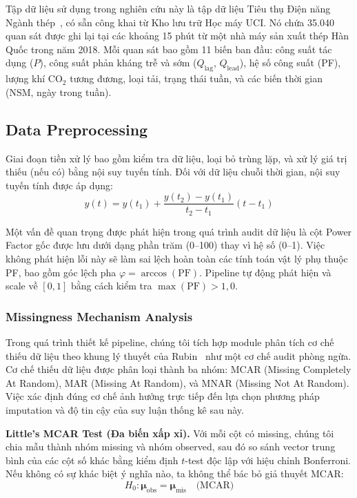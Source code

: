 \documentclass[conference]{IEEEtran}
\begin{document}
Tập dữ liệu sử dụng trong nghiên cứu này là tập dữ liệu Tiêu thụ Điện năng Ngành thép~\cite{uci2023}, có sẵn công khai từ Kho lưu trữ Học máy UCI.
Nó chứa 35.040 quan sát được ghi lại tại các khoảng 15 phút từ một nhà máy sản xuất thép Hàn Quốc trong năm 2018.
Mỗi quan sát bao gồm 11 biến ban đầu: công suất tác dụng ($P$), công suất phản kháng trễ và sớm ($Q_{\text{lag}}$, $Q_{\text{lead}}$), hệ số công suất (PF), lượng khí CO$_2$ tương đương, loại tải, trạng thái tuần, và các biến thời gian (NSM, ngày trong tuần).

\subsection{Data Preprocessing}

Giai đoạn tiền xử lý bao gồm kiểm tra dữ liệu, loại bỏ trùng lặp, và xử lý giá trị thiếu (nếu có) bằng nội suy tuyến tính.
Đối với dữ liệu chuỗi thời gian, nội suy tuyến tính được áp dụng:
\begin{equation}
y(t) = y(t_1) + \frac{y(t_2) - y(t_1)}{t_2 - t_1}(t - t_1)
\label{eq:interp}
\end{equation}

Một vấn đề quan trọng được phát hiện trong quá trình audit dữ liệu là cột Power Factor gốc được lưu dưới dạng phần trăm (0--100) thay vì hệ số (0--1).
Việc không phát hiện lỗi này sẽ làm sai lệch hoàn toàn các tính toán vật lý phụ thuộc PF, bao gồm góc lệch pha $\varphi = \arccos(\text{PF})$.
Pipeline tự động phát hiện và scale về $[0,1]$ bằng cách kiểm tra $\max(\text{PF}) > 1{,}0$.

\subsubsection{Missingness Mechanism Analysis}

Trong quá trình thiết kế pipeline, chúng tôi tích hợp module phân tích cơ chế thiếu dữ liệu theo khung lý thuyết của Rubin~\cite{rubin1976} như một cơ chế audit phòng ngừa.
Cơ chế thiếu dữ liệu được phân loại thành ba nhóm: MCAR (Missing Completely At Random), MAR (Missing At Random), và MNAR (Missing Not At Random).
Việc xác định đúng cơ chế ảnh hưởng trực tiếp đến lựa chọn phương pháp imputation và độ tin cậy của suy luận thống kê sau này.

\textbf{Little's MCAR Test (Đa biến xấp xỉ).}
Với mỗi cột có missing, chúng tôi chia mẫu thành nhóm missing và nhóm observed, sau đó so sánh vector trung bình của các cột số khác bằng kiểm định $t$-test độc lập với hiệu chỉnh Bonferroni.
Nếu không có sự khác biệt ý nghĩa nào, ta không thể bác bỏ giả thuyết MCAR:
\begin{equation}
H_0: \boldsymbol{\mu}_{\text{obs}} = \boldsymbol{\mu}_{\text{mis}} \quad \text{(MCAR)}
\label{eq:mcar}
\end{equation}
\end{document}

